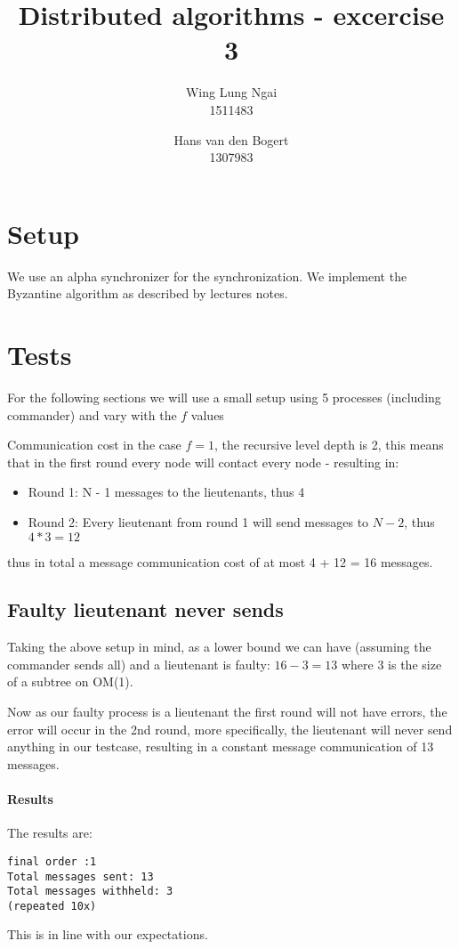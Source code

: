 \documentclass{article}
\title{Distributed algorithms - excercise 3}
\author{Wing Lung Ngai\\1511483 \and Hans van den Bogert \\1307983}
\begin{document}
 
\maketitle
\section{Setup}
We use an alpha synchronizer for the synchronization. We implement the
Byzantine algorithm as described by lectures notes. 

\section{Tests}
For the following sections we will use a small setup using 5 processes
(including commander) and vary with the $f$ values

 Communication cost in the case $f=1$, the
recursive level depth is 2, this means that in the first round every
node will contact every node - resulting in:
\begin{itemize}
\item Round 1: N - 1 messages to the lieutenants, thus 4

\item Round 2: Every lieutenant from round 1 will send messages to $N -
2$, thus $4*3 = 12$
\end{itemize}
thus in total a message communication cost of at most 4 + 12 = 16
messages.

\subsection{Faulty lieutenant never sends}
Taking the above setup in mind, as a lower bound we can have (assuming
the commander sends all) and a lieutenant is faulty: $16 - 3 = 13$
where $3$ is the size of a subtree on OM(1).

Now as our faulty process is a lieutenant the first round will not
have errors, the error will occur in the 2nd round, more specifically,
the lieutenant will never send anything in our testcase, resulting in
a constant message communication of 13 messages.
\paragraph{Results}
The results are:
\begin{lstlisting}
final order :1
Total messages sent: 13
Total messages withheld: 3
(repeated 10x)
\end{lstlisting}
This is in line with our expectations.
\end{document}
